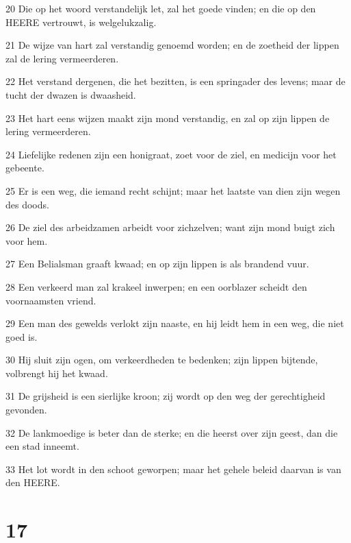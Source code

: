 \par 20 Die op het woord verstandelijk let, zal het goede vinden; en die op den HEERE vertrouwt, is welgelukzalig.
\par 21 De wijze van hart zal verstandig genoemd worden; en de zoetheid der lippen zal de lering vermeerderen.
\par 22 Het verstand dergenen, die het bezitten, is een springader des levens; maar de tucht der dwazen is dwaasheid.
\par 23 Het hart eens wijzen maakt zijn mond verstandig, en zal op zijn lippen de lering vermeerderen.
\par 24 Liefelijke redenen zijn een honigraat, zoet voor de ziel, en medicijn voor het gebeente.
\par 25 Er is een weg, die iemand recht schijnt; maar het laatste van dien zijn wegen des doods.
\par 26 De ziel des arbeidzamen arbeidt voor zichzelven; want zijn mond buigt zich voor hem.
\par 27 Een Belialsman graaft kwaad; en op zijn lippen is als brandend vuur.
\par 28 Een verkeerd man zal krakeel inwerpen; en een oorblazer scheidt den voornaamsten vriend.
\par 29 Een man des gewelds verlokt zijn naaste, en hij leidt hem in een weg, die niet goed is.
\par 30 Hij sluit zijn ogen, om verkeerdheden te bedenken; zijn lippen bijtende, volbrengt hij het kwaad.
\par 31 De grijsheid is een sierlijke kroon; zij wordt op den weg der gerechtigheid gevonden.
\par 32 De lankmoedige is beter dan de sterke; en die heerst over zijn geest, dan die een stad inneemt.
\par 33 Het lot wordt in den schoot geworpen; maar het gehele beleid daarvan is van den HEERE.

\chapter{17}

